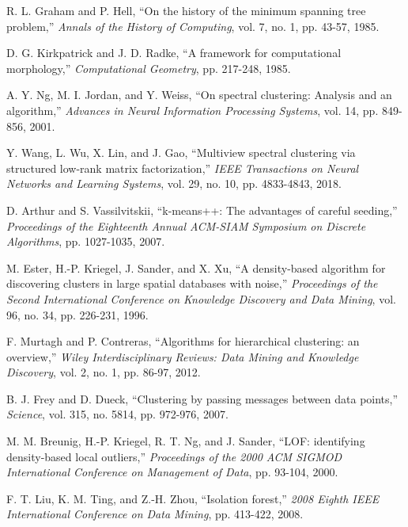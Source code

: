 \documentclass[12pt,twoside,a4paper,fleqn,bibliography=totocnumbered]{report}
\begin{document}
\begin{thebibliography}{1}
 R. L. Graham and P. Hell, ``On the history of the minimum spanning tree problem,'' \emph{Annals of the History of Computing}, vol. 7, no. 1, pp. 43-57, 1985.

 D. G. Kirkpatrick and J. D. Radke, ``A framework for computational morphology,'' \emph{Computational Geometry}, pp. 217-248, 1985.

 A. Y. Ng, M. I. Jordan, and Y. Weiss, ``On spectral clustering: Analysis and an algorithm,'' \emph{Advances in Neural Information Processing Systems}, vol. 14, pp. 849-856, 2001.

 Y. Wang, L. Wu, X. Lin, and J. Gao, ``Multiview spectral clustering via structured low-rank matrix factorization,'' \emph{IEEE Transactions on Neural Networks and Learning Systems}, vol. 29, no. 10, pp. 4833-4843, 2018.

 D. Arthur and S. Vassilvitskii, ``k-means++: The advantages of careful seeding,'' \emph{Proceedings of the Eighteenth Annual ACM-SIAM Symposium on Discrete Algorithms}, pp. 1027-1035, 2007.

 M. Ester, H.-P. Kriegel, J. Sander, and X. Xu, ``A density-based algorithm for discovering clusters in large spatial databases with noise,'' \emph{Proceedings of the Second International Conference on Knowledge Discovery and Data Mining}, vol. 96, no. 34, pp. 226-231, 1996.

 F. Murtagh and P. Contreras, ``Algorithms for hierarchical clustering: an overview,'' \emph{Wiley Interdisciplinary Reviews: Data Mining and Knowledge Discovery}, vol. 2, no. 1, pp. 86-97, 2012.

 B. J. Frey and D. Dueck, ``Clustering by passing messages between data points,'' \emph{Science}, vol. 315, no. 5814, pp. 972-976, 2007.

 M. M. Breunig, H.-P. Kriegel, R. T. Ng, and J. Sander, ``LOF: identifying density-based local outliers,'' \emph{Proceedings of the 2000 ACM SIGMOD International Conference on Management of Data}, pp. 93-104, 2000.

 F. T. Liu, K. M. Ting, and Z.-H. Zhou, ``Isolation forest,'' \emph{2008 Eighth IEEE International Conference on Data Mining}, pp. 413-422, 2008.


\end{thebibliography}
\end{document}
